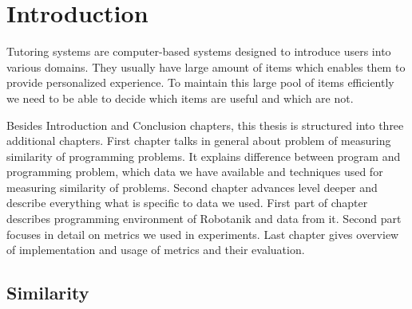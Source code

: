\documentclass[
  digital, %
  table,   %
  nolof,     %
  nolot,     %
  nocover
]{fithesis3}
\begin{document}
%
%
%
%


\chapter*{Introduction}



Tutoring systems are computer-based systems designed to introduce users
into various domains. They usually have large amount of items which
enables them to provide personalized experience. To maintain this large
pool of items efficiently we need to be able to decide which items are
useful and which are not.





Besides Introduction and Conclusion chapters, this thesis is structured
into three additional chapters. First chapter talks in general about
problem of measuring similarity of programming problems. It explains
difference between program and programming problem, which data we have
available and techniques used for measuring similarity of problems.
Second chapter advances level deeper and describe everything what is
specific to data we used. First part of chapter describes programming
environment of Robotanik and data from it. Second part focuses in detail
on metrics we used in experiments. Last chapter gives overview of
implementation and usage of metrics and their evaluation.

\section{Similarity}\label{similarity}
\end{document}
